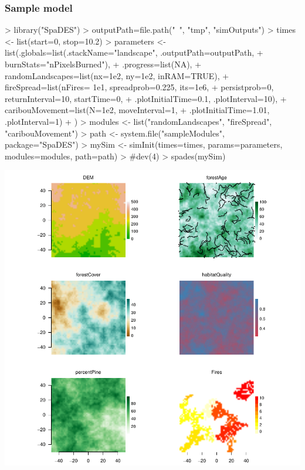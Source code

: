 \documentclass{article}
\begin{document}
\newpage

\subsubsection{Sample model}

\begin{Schunk}
\begin{Sinput}
> library("SpaDES")
> outputPath=file.path("~", "tmp", "simOutputs")
> times <- list(start=0, stop=10.2)
> parameters <- list(.globals=list(.stackName="landscape", .outputPath=outputPath,
+                                  burnStats="nPixelsBurned"),
+                    .progress=list(NA),
+                    randomLandscapes=list(nx=1e2, ny=1e2, inRAM=TRUE),
+                    fireSpread=list(nFires= 1e1, spreadprob=0.225, its=1e6,
+                                    persistprob=0, returnInterval=10, startTime=0,
+                                   .plotInitialTime=0.1, .plotInterval=10),
+                    caribouMovement=list(N=1e2, moveInterval=1,
+                                         .plotInitialTime=1.01, .plotInterval=1)
+                    )
> modules <- list("randomLandscapes", "fireSpread", "caribouMovement")
> path <- system.file("sampleModules", package="SpaDES")
> mySim <- simInit(times=times, params=parameters, modules=modules, path=path)
> #dev(4)
> spades(mySim)
\end{Sinput}
\end{Schunk}
\includegraphics{introduction-using-SpaDES}
\end{document}
